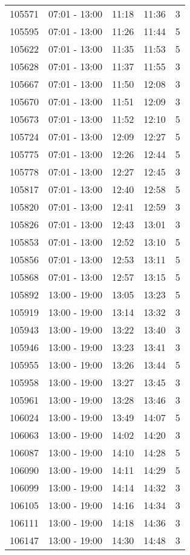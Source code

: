 \documentclass{article}
\begin{document}
\begin{tabular}{llccc}
105571 & 07:01 - 13:00 & 11:18 & 11:36 & 3 \\
105595 & 07:01 - 13:00 & 11:26 & 11:44 & 5 \\
105622 & 07:01 - 13:00 & 11:35 & 11:53 & 5 \\
105628 & 07:01 - 13:00 & 11:37 & 11:55 & 3 \\
105667 & 07:01 - 13:00 & 11:50 & 12:08 & 3 \\
105670 & 07:01 - 13:00 & 11:51 & 12:09 & 3 \\
105673 & 07:01 - 13:00 & 11:52 & 12:10 & 5 \\
105724 & 07:01 - 13:00 & 12:09 & 12:27 & 5 \\
105775 & 07:01 - 13:00 & 12:26 & 12:44 & 5 \\
105778 & 07:01 - 13:00 & 12:27 & 12:45 & 3 \\
105817 & 07:01 - 13:00 & 12:40 & 12:58 & 5 \\
105820 & 07:01 - 13:00 & 12:41 & 12:59 & 3 \\
105826 & 07:01 - 13:00 & 12:43 & 13:01 & 3 \\
105853 & 07:01 - 13:00 & 12:52 & 13:10 & 5 \\
105856 & 07:01 - 13:00 & 12:53 & 13:11 & 5 \\
105868 & 07:01 - 13:00 & 12:57 & 13:15 & 5 \\
105892 & 13:00 - 19:00 & 13:05 & 13:23 & 5 \\
105919 & 13:00 - 19:00 & 13:14 & 13:32 & 3 \\
105943 & 13:00 - 19:00 & 13:22 & 13:40 & 3 \\
105946 & 13:00 - 19:00 & 13:23 & 13:41 & 3 \\
105955 & 13:00 - 19:00 & 13:26 & 13:44 & 5 \\
105958 & 13:00 - 19:00 & 13:27 & 13:45 & 3 \\
105961 & 13:00 - 19:00 & 13:28 & 13:46 & 3 \\
106024 & 13:00 - 19:00 & 13:49 & 14:07 & 5 \\
106063 & 13:00 - 19:00 & 14:02 & 14:20 & 3 \\
106087 & 13:00 - 19:00 & 14:10 & 14:28 & 5 \\
106090 & 13:00 - 19:00 & 14:11 & 14:29 & 5 \\
106099 & 13:00 - 19:00 & 14:14 & 14:32 & 3 \\
106105 & 13:00 - 19:00 & 14:16 & 14:34 & 3 \\
106111 & 13:00 - 19:00 & 14:18 & 14:36 & 3 \\
106147 & 13:00 - 19:00 & 14:30 & 14:48 & 3 \\

\end{tabular}
\end{document}
